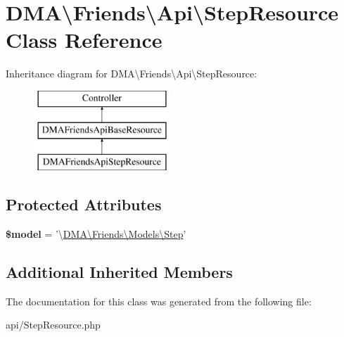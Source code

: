 \hypertarget{classDMA_1_1Friends_1_1Api_1_1StepResource}{\section{D\-M\-A\textbackslash{}Friends\textbackslash{}Api\textbackslash{}Step\-Resource Class Reference}
\label{classDMA_1_1Friends_1_1Api_1_1StepResource}
}
Inheritance diagram for D\-M\-A\textbackslash{}Friends\textbackslash{}Api\textbackslash{}Step\-Resource\-:\begin{figure}[H]
\begin{center}
\leavevmode
\includegraphics[height=3.000000cm]{d8/da8/classDMA_1_1Friends_1_1Api_1_1StepResource}
\end{center}
\end{figure}
\subsection*{Protected Attributes}
\begin{DoxyCompactItemize}
\item 
\hypertarget{classDMA_1_1Friends_1_1Api_1_1StepResource_a96b8c504a8e7c87634d2d33873bb9ac3}{{\bfseries \$model} = '\textbackslash{}\hyperlink{classDMA_1_1Friends_1_1Models_1_1Step}{D\-M\-A\textbackslash{}\-Friends\textbackslash{}\-Models\textbackslash{}\-Step}'}\label{classDMA_1_1Friends_1_1Api_1_1StepResource_a96b8c504a8e7c87634d2d33873bb9ac3}

\end{DoxyCompactItemize}
\subsection*{Additional Inherited Members}


The documentation for this class was generated from the following file\-:\begin{DoxyCompactItemize}
\item 
api/Step\-Resource.\-php\end{DoxyCompactItemize}
